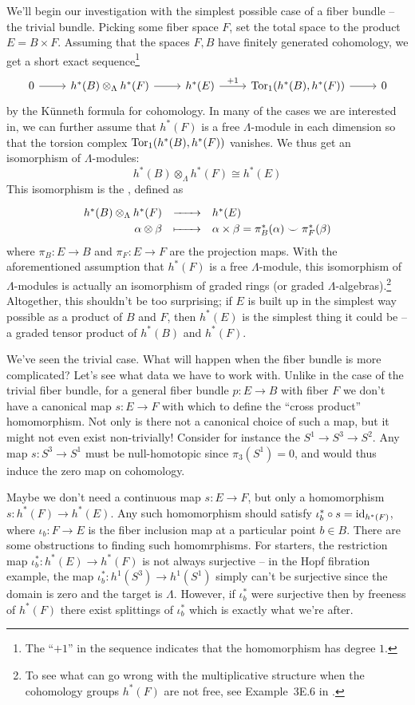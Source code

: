 We'll begin our investigation with the simplest possible case of a fiber bundle -- the trivial bundle. Picking some fiber space $F$, set the total space to the product $E=B\times F$. Assuming that the spaces $F, B$ have finitely generated cohomology, we get a short exact sequence\footnote{The ``$+1$'' in the sequence indicates that the homomorphism has degree $1$.}
\[
	\begin{tikzcd}
		0 \arrow[r] & h^*(B)\otimes_\Lambda h^*(F) \arrow[r] & h^*(E) \arrow[r, "+1"] & \Tor_1(h^*(B), h^*(F)) \arrow[r] & 0
	\end{tikzcd}
\]
by the K\"unneth formula for cohomology. In many of the cases we are interested in, we can further assume that $h^*(F)$ is a free $\Lambda$-module in each dimension so that the torsion complex $\operatorname{Tor}_1(h^*(B), h^*(F))$ vanishes. We thus get an isomorphism of $\Lambda$-modules:
\[h^*(B)\otimes_\Lambda h^*(F)\cong h^*(E)\]
This isomorphism is the , defined as
\[
	\definefunction{}{h^*(B)\otimes_\Lambda h^*(F)}{h^*(E)}{\alpha\otimes \beta}{\alpha\times\beta = \pi_B^*(\alpha)\smile \pi_F^*(\beta)}
\]
where $\pi_B : E \to B$ and $\pi_F : E \to F$ are the projection maps. With the aforementioned assumption that $h^*(F)$ is a free $\Lambda$-module, this isomorphism of $\Lambda$-modules is actually an isomorphism of graded rings (or graded $\Lambda$-algebras).\footnote{To see what can go wrong with the multiplicative structure when the cohomology groups $h^*(F)$ are not free, see Example~3E.6 in \cite{hatcher2002}.
}
Altogether, this shouldn't be too surprising; if $E$ is built up in the simplest way possible as a product of $B$ and $F$, then $h^*(E)$ is the simplest thing it could be -- a graded tensor product of $h^*(B)$ and $h^*(F)$.

We've seen the trivial case. What will happen when the fiber bundle is more complicated? Let's see what data we have to work with. Unlike in the case of the trivial fiber bundle, for a general fiber bundle $p : E \to B$ with fiber $F$ we don't have a canonical map $s : E\to F$ with which to define the ``cross product'' homomorphism.
Not only is there not a canonical choice of such a map, but it might not even exist non-trivially! Consider for instance the  $S^1\to S^3 \to S^2$. Any map $s : S^3\to S^1$ must be null-homotopic since $\pi_3(S^1)=0$, and would thus induce the zero map on cohomology.

Maybe we don't need a continuous map $s : E \to F$, but only a homomorphism $s : h^*(F) \to h^*(E)$.
Any such homomorphism should satisfy $\iota_b^*\circ s = \operatorname{id}_{h^*(F)}$, where $\iota_b : F \to E$ is the fiber inclusion map at a particular point $b\in B$. There are some obstructions to finding such homomrphisms. For starters, the restriction map $\iota_b^* : h^*(E) \to h^*(F)$ is not always surjective -- in the Hopf fibration example, the map $\iota_b^* : h^1(S^3) \to h^1(S^1)$ simply can't be surjective since the domain is zero and the target is $\Lambda$. However, if $\iota_b^*$ were surjective then by freeness of $h^*(F)$ there exist splittings of $\iota_b^*$ which is exactly what we're after.

